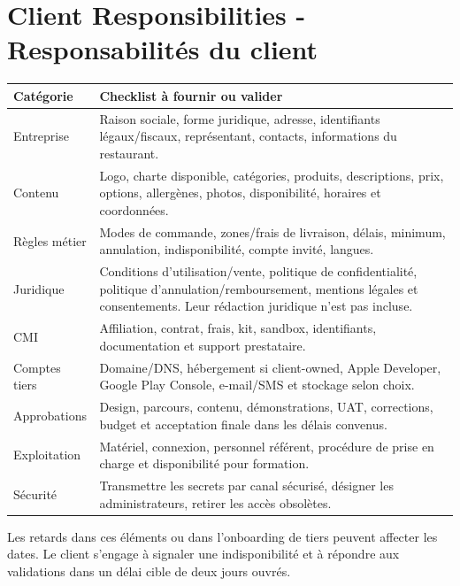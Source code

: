 \documentclass[10pt,a4paper]{article}
\begin{document}
\section{Client Responsibilities - Responsabilités du client}
\begin{tabularx}{\linewidth}{@{}L{3.2cm}Y@{}}
\toprule
\textbf{Catégorie} & \textbf{Checklist à fournir ou valider} \\
\midrule
Entreprise & Raison sociale, forme juridique, adresse, identifiants légaux/fiscaux, représentant, contacts, informations du restaurant. \\
Contenu & Logo, charte disponible, catégories, produits, descriptions, prix, options, allergènes, photos, disponibilité, horaires et coordonnées. \\
Règles métier & Modes de commande, zones/frais de livraison, délais, minimum, annulation, indisponibilité, compte invité, langues. \\
Juridique & Conditions d'utilisation/vente, politique de confidentialité, politique d'annulation/remboursement, mentions légales et consentements. Leur rédaction juridique n'est pas incluse. \\
CMI & Affiliation, contrat, frais, kit, sandbox, identifiants, documentation et support prestataire. \\
Comptes tiers & Domaine/DNS, hébergement si client-owned, Apple Developer, Google Play Console, e-mail/SMS et stockage selon choix. \\
Approbations & Design, parcours, contenu, démonstrations, UAT, corrections, budget et acceptation finale dans les délais convenus. \\
Exploitation & Matériel, connexion, personnel référent, procédure de prise en charge et disponibilité pour formation. \\
Sécurité & Transmettre les secrets par canal sécurisé, désigner les administrateurs, retirer les accès obsolètes. \\
\bottomrule
\end{tabularx}
Les retards dans ces éléments ou dans l'onboarding de tiers peuvent affecter les dates. Le client s'engage à signaler une indisponibilité et à répondre aux validations dans un délai cible de deux jours ouvrés.
\end{document}
